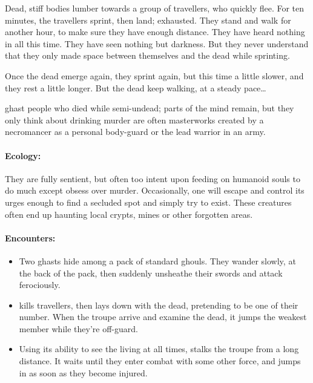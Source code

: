 \begin{multicols}{2}
\begin{exampletext}
  Dead, stiff bodies lumber towards a group of travellers, who quickly flee.
  For ten minutes, the travellers sprint, then land; exhausted.
  They stand and walk for another hour, to make sure they have enough distance.
  They have heard nothing in all this time.
  They have seen nothing but darkness.
  But they never understand that they only made space between themselves and the dead while sprinting.

  Once the dead emerge again, they sprint again, but this time a little slower, and they rest a little longer.
  But the dead keep walking, at a steady pace\ldots
\end{exampletext}

  {ghast}%
  {people who died while semi-undead; parts of the mind remain, but they only think about drinking murder}%
are often masterworks created by a necromancer as a personal body-guard or the lead warrior in an army.

\paragraph{Ecology:} They are fully sentient, but often too intent upon feeding on humanoid souls to do much except obsess over murder.
Occasionally, one will escape and control its urges enough to find a secluded spot and simply try to exist.
These creatures often end up haunting local crypts, mines or other forgotten areas.

\paragraph{Encounters:}

\null
\begin{itemize}
  \item
  Two \glspl{ghast} hide among a pack of standard \glspl{ghoul}.
  They wander slowly, at the back of the pack, then suddenly unsheathe their swords and attack ferociously.
  \item
   kills travellers, then lays down with the dead, pretending to be one of their number.
  When the troupe arrive and examine the dead, it jumps the weakest member while they're off-guard.
  \item
  Using its ability to see the living at all times,  stalks the troupe from a long distance.
  It waits until they enter combat with some other force, and jumps in as soon as they become injured.
\end{itemize}


\end{multicols}
